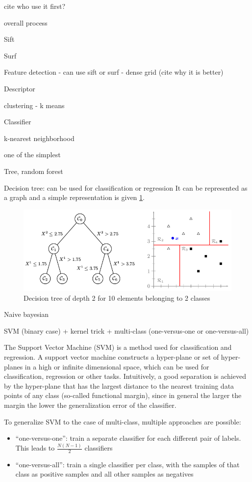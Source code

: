 cite who use it first?

overall process

Sift

Surf

Feature detection
- can use sift or surf
- dense grid (cite why it is better)

Descriptor

clustering
- k means

Classifier

k-nearest neighborhood

one of the simplest

Tree, random forest

Decision tree: can be used for classification or regression
It can be represented as a graph and a simple representation is given \ref{fig:decision_tree_simple_example}.

\begin{figure}[h]
    \includegraphics[scale=0.5]{img/decision_tree_simple_example}
    \caption{Decision tree of depth 2 for 10 elements belonging to 2 classes}
    \label{fig:decision_tree_simple_example}
\end{figure}


Naive bayesian

SVM (binary case) + kernel trick + multi-class (one-versus-one or one-versus-all)

The Support Vector Machine (SVM) is a method used for classification and regression. A support vector machine constructs a hyper-plane or set of hyper-planes in a high or infinite dimensional space, which can be used for classification, regression or other tasks. Intuitively, a good separation is achieved by the hyper-plane that has the largest distance to the nearest training data points of any class (so-called functional margin), since in general the larger the margin the lower the generalization error of the classifier.

To generalize SVM to the case of multi-class, multiple approaches are possible:
\begin{itemize}
    \item \enquote{one-versus-one}: train a separate classifier for each different pair of labels. This leads to $\frac{N (N - 1)}{2}$ classifiers
    \item \enquote{one-versus-all}: train a single classifier per class, with the samples of that class as positive samples and all other samples as negatives
\end{itemize}

